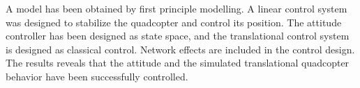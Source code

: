 A model has been obtained by first principle modelling. A linear control system was designed to stabilize the quadcopter and control its position. The attitude controller has been designed as state space, and the translational control system is designed as classical control. Network effects are included in the control design. The results reveals that the attitude and the simulated translational quadcopter behavior have been successfully controlled.